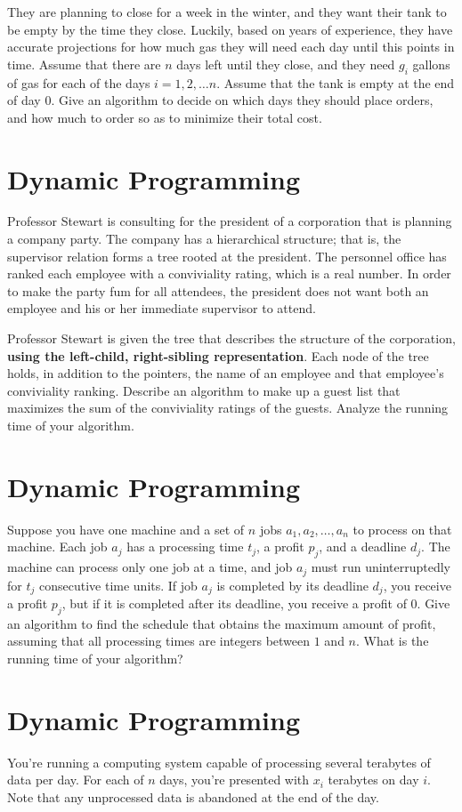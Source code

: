 They are planning to close for a week in the winter, 
and they want their tank to be empty by the time they close. 
Luckily, based on years of experience, 
they have accurate projections for how much gas they will need each day until this points in time. 
Assume that there are $n$ days left until they close, 
and they need $g_i$ gallons of gas for each of the days $i = 1, 2, \ldots n$. 
Assume that the tank is empty at the end of day $0$. 
Give an algorithm to decide on which days they should place orders, 
and how much to order so as to minimize their total cost.
%
%
\section{Dynamic Programming}
\noindent
Professor Stewart is consulting for the president of a corporation that is planning a company party. 
The company has a hierarchical structure; 
that is, the supervisor relation forms a tree rooted at the president. 
The personnel office has ranked each employee with a conviviality rating, 
which is a real number. 
In order to make the party fum for all attendees, 
the president does not want both an employee and his or her immediate supervisor to attend.

Professor Stewart is given the tree that describes the structure of the corporation, 
{\bf using the left-child, right-sibling representation}. 
Each node of the tree holds, in addition to the pointers, 
the name of an employee and that employee's conviviality ranking. 
Describe an algorithm to make up a guest list that 
maximizes the sum of the conviviality ratings of the guests. 
Analyze the running time of your algorithm.
%
%
\section{Dynamic Programming}
\noindent
Suppose you have one machine and a set of $n$ jobs $a_1, a_2, \dots, a_n$ to process on that machine. 
Each job $a_j$ has a processing time $t_j$, a profit $p_j$, and a deadline $d_j$. 
The machine can process only one job at a time, 
and job $a_j$ must run uninterruptedly for $t_j$ consecutive time units. 
If job $a_j$ is completed by its deadline $d_j$, you receive a profit $p_j$, 
but if it is completed after its deadline, you receive a profit of $0$. 
Give an algorithm to find the schedule that obtains the maximum amount of profit, 
assuming that all processing times are integers between $1$ and $n$. 
What is the running time of your algorithm?
%
%
\section{Dynamic Programming}
\noindent
You're running a computing system capable of processing several terabytes of data per day. 
For each of $n$ days, you're presented with $x_i$ terabytes on day $i$. 
Note that any unprocessed data is abandoned at the end of the day.

